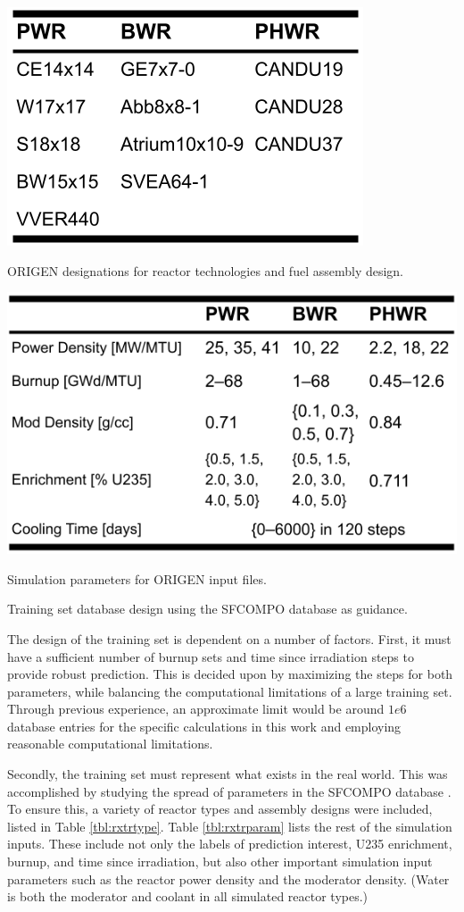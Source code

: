 \begin{table}[!htb]
  \centering
  \begin{subtable}{\linewidth}
    \centering
    \includegraphics[width=0.5\linewidth]{./chapters/method/trainset4_Orxtrs.png}
    \caption{\gls{ORIGEN} designations for reactor technologies and fuel assembly design.}
    \label{tbl:rxtrtype}
    \vspace*{5mm}
  \end{subtable}
  \begin{subtable}{\linewidth}
    \centering
    \includegraphics[width=0.75\linewidth]{./chapters/method/trainset4_inputs.png}
    \caption{Simulation parameters for \gls{ORIGEN} input files.}
    \label{tbl:rxtrparam}
  \end{subtable}%
  \caption{Training set database design using the \gls{SFCOMPO} database as guidance. \cite{sfcompo}}
  \label{tbl:train}
\end{table}

The design of the training set is dependent on a number of factors.  First, it
must have a sufficient number of burnup sets and time since irradiation steps
to provide robust prediction. This is decided upon by maximizing the steps for
both parameters, while balancing the computational limitations of a large
training set. Through previous experience, an approximate limit would be around
$1e6$ database entries for the specific calculations in this work and employing
reasonable computational limitations.

Secondly, the training set must represent what exists in the real world. This
was accomplished by studying the spread of parameters in the \gls{SFCOMPO}
database \cite{sfcompo}.  To ensure this, a variety of reactor types and
assembly designs were included, listed in Table \ref{tbl:rxtrtype}. Table
\ref{tbl:rxtrparam} lists the rest of the simulation inputs. These include not
only the labels of prediction interest, \gls{U235} enrichment, burnup, and time
since irradiation, but also other important simulation input parameters such as
the reactor power density and the moderator density.  (Water is both the
moderator and coolant in all simulated reactor types.)

